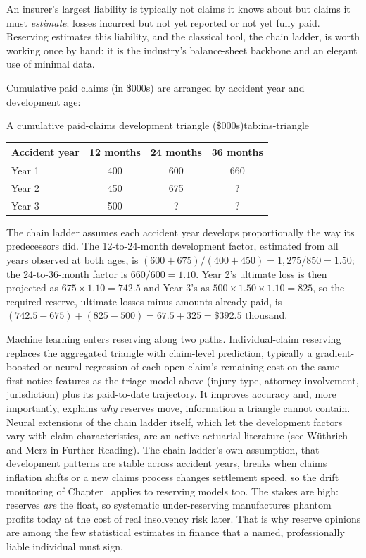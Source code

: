 \documentclass[../ai_in_finance]{subfiles}
\begin{document}
An insurer's largest liability is typically not claims it knows about but claims it must \emph{estimate}: losses incurred but not yet reported or not yet fully paid. Reserving estimates this liability, and the classical tool, the chain ladder, is worth working once by hand: it is the industry's balance-sheet backbone and an elegant use of minimal data.

Cumulative paid claims (in \$000s) are arranged by accident year and development age:
\begin{booktable}[htbp]{A cumulative paid-claims development triangle (\$000s)}{tab:ins-triangle}
\begin{tabular}{lccc}
\toprule
Accident year & 12 months & 24 months & 36 months \\
\midrule
Year 1 & 400 & 600 & 660 \\
Year 2 & 450 & 675 & ? \\
Year 3 & 500 & ? & ? \\
\bottomrule
\end{tabular}
\end{booktable}

The chain ladder assumes each accident year develops proportionally the way its predecessors did. The 12-to-24-month development factor, estimated from all years observed at both ages, is $(600+675)/(400+450) = 1{,}275/850 = 1.50$; the 24-to-36-month factor is $660/600 = 1.10$. Year 2's ultimate loss is then projected as $675 \times 1.10 = 742.5$ and Year 3's as $500 \times 1.50 \times 1.10 = 825$, so the required reserve, ultimate losses minus amounts already paid, is $(742.5 - 675) + (825 - 500) = 67.5 + 325 = \$392.5$ thousand.

Machine learning enters reserving along two paths. Individual-claim reserving replaces the aggregated triangle with claim-level prediction, typically a gradient-boosted or neural regression of each open claim's remaining cost on the same first-notice features as the triage model above (injury type, attorney involvement, jurisdiction) plus its paid-to-date trajectory. It improves accuracy and, more importantly, explains \emph{why} reserves move, information a triangle cannot contain. Neural extensions of the chain ladder itself, which let the development factors vary with claim characteristics, are an active actuarial literature (see W\"uthrich and Merz in Further Reading). The chain ladder's own assumption, that development patterns are stable across accident years, breaks when claims inflation shifts or a new claims process changes settlement speed, so the drift monitoring of Chapter~ applies to reserving models too. The stakes are high: reserves \emph{are} the float, so systematic under-reserving manufactures phantom profits today at the cost of real insolvency risk later. That is why reserve opinions are among the few statistical estimates in finance that a named, professionally liable individual must sign.
\end{document}
